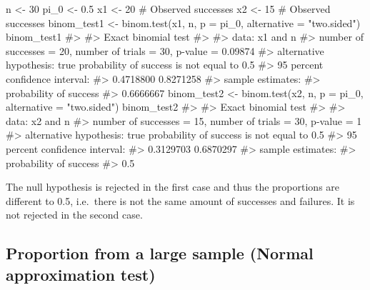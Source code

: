 \documentclass[
  letterpaper,
  DIV=11,
  numbers=noendperiod]{scrreprt}
\newenvironment{Shaded}{\begin{snugshade}}{\end{snugshade}}
\newcommand{\AttributeTok}[1]{\textcolor[rgb]{0.40,0.45,0.13}{#1}}
\newcommand{\CommentTok}[1]{\textcolor[rgb]{0.37,0.37,0.37}{#1}}
\newcommand{\DecValTok}[1]{\textcolor[rgb]{0.68,0.00,0.00}{#1}}
\newcommand{\FloatTok}[1]{\textcolor[rgb]{0.68,0.00,0.00}{#1}}
\newcommand{\FunctionTok}[1]{\textcolor[rgb]{0.28,0.35,0.67}{#1}}
\newcommand{\NormalTok}[1]{\textcolor[rgb]{0.00,0.23,0.31}{#1}}
\newcommand{\OtherTok}[1]{\textcolor[rgb]{0.00,0.23,0.31}{#1}}
\newcommand{\StringTok}[1]{\textcolor[rgb]{0.13,0.47,0.30}{#1}}
\begin{document}
\begin{Shaded}
\begin{Highlighting}[]
\NormalTok{n }\OtherTok{\textless{}{-}} \DecValTok{30}
\NormalTok{pi\_0 }\OtherTok{\textless{}{-}} \FloatTok{0.5}
\NormalTok{x1 }\OtherTok{\textless{}{-}} \DecValTok{20} \CommentTok{\# Observed successes}
\NormalTok{x2 }\OtherTok{\textless{}{-}} \DecValTok{15} \CommentTok{\# Observed successes}
\NormalTok{binom\_test1 }\OtherTok{\textless{}{-}} \FunctionTok{binom.test}\NormalTok{(x1, n, }\AttributeTok{p =}\NormalTok{ pi\_0, }\AttributeTok{alternative =} \StringTok{"two.sided"}\NormalTok{)}
\NormalTok{binom\_test1}
\CommentTok{\#\textgreater{} }
\CommentTok{\#\textgreater{}  Exact binomial test}
\CommentTok{\#\textgreater{} }
\CommentTok{\#\textgreater{} data:  x1 and n}
\CommentTok{\#\textgreater{} number of successes = 20, number of trials = 30, p{-}value = 0.09874}
\CommentTok{\#\textgreater{} alternative hypothesis: true probability of success is not equal to 0.5}
\CommentTok{\#\textgreater{} 95 percent confidence interval:}
\CommentTok{\#\textgreater{}  0.4718800 0.8271258}
\CommentTok{\#\textgreater{} sample estimates:}
\CommentTok{\#\textgreater{} probability of success }
\CommentTok{\#\textgreater{}              0.6666667}
\NormalTok{binom\_test2 }\OtherTok{\textless{}{-}} \FunctionTok{binom.test}\NormalTok{(x2, n, }\AttributeTok{p =}\NormalTok{ pi\_0, }\AttributeTok{alternative =} \StringTok{"two.sided"}\NormalTok{)}
\NormalTok{binom\_test2}
\CommentTok{\#\textgreater{} }
\CommentTok{\#\textgreater{}  Exact binomial test}
\CommentTok{\#\textgreater{} }
\CommentTok{\#\textgreater{} data:  x2 and n}
\CommentTok{\#\textgreater{} number of successes = 15, number of trials = 30, p{-}value = 1}
\CommentTok{\#\textgreater{} alternative hypothesis: true probability of success is not equal to 0.5}
\CommentTok{\#\textgreater{} 95 percent confidence interval:}
\CommentTok{\#\textgreater{}  0.3129703 0.6870297}
\CommentTok{\#\textgreater{} sample estimates:}
\CommentTok{\#\textgreater{} probability of success }
\CommentTok{\#\textgreater{}                    0.5}
\end{Highlighting}
\end{Shaded}

The null hypothesis is rejected in the first case and thus the
proportions are different to 0.5, i.e.~there is not the same amount of
successes and failures. It is not rejected in the second case.

\subsection{Proportion from a large sample (Normal approximation
test)}\label{proportion-from-a-large-sample-normal-approximation-test}
\end{document}
